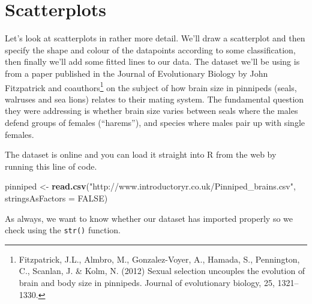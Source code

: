 \documentclass[
]{book}
\newenvironment{Shaded}{\begin{snugshade}}{\end{snugshade}}
\newcommand{\DataTypeTok}[1]{\textcolor[rgb]{0.13,0.29,0.53}{#1}}
\newcommand{\KeywordTok}[1]{\textcolor[rgb]{0.13,0.29,0.53}{\textbf{#1}}}
\newcommand{\NormalTok}[1]{#1}
\newcommand{\OtherTok}[1]{\textcolor[rgb]{0.56,0.35,0.01}{#1}}
\newcommand{\StringTok}[1]{\textcolor[rgb]{0.31,0.60,0.02}{#1}}
\begin{document}
\hypertarget{scatterplots}{%
\section{Scatterplots}\label{scatterplots}}

Let's look at scatterplots in rather more detail. We'll draw a scatterplot and then specify the shape and colour of the datapoints according to some classification, then finally we'll add some fitted lines to our data. The dataset we'll be using is from a paper published in the Journal of Evolutionary Biology by John Fitzpatrick and coauthors\footnote{Fitzpatrick, J.L., Almbro, M., Gonzalez-Voyer, A., Hamada, S., Pennington, C., Scanlan, J. \& Kolm, N. (2012) Sexual selection uncouples the evolution of brain and body size in pinnipeds. Journal of evolutionary biology, 25, 1321--1330.} on the subject of how brain size in pinnipeds (seals, walruses and sea lions) relates to their mating system. The fundamental question they were addressing is whether brain size varies between seals where the males defend groups of females (``harems''), and species where males pair up with single females.

The dataset is online and you can load it straight into R from the web by running this line of code.

\begin{Shaded}
\begin{Highlighting}[]
\NormalTok{pinniped <-}\StringTok{ }\KeywordTok{read.csv}\NormalTok{(}\StringTok{"http://www.introductoryr.co.uk/Pinniped_brains.csv"}\NormalTok{, }\DataTypeTok{stringsAsFactors =} \OtherTok{FALSE}\NormalTok{)}
\end{Highlighting}
\end{Shaded}

As always, we want to know whether our dataset has imported properly so we check using the \texttt{str()} function.
\end{document}
